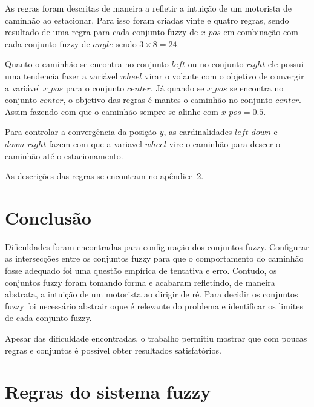 \documentclass[12pt, a4paper]{article}
\begin{document}
As regras foram descritas de maneira a refletir a intuição de um motorista de caminhão ao estacionar.
Para isso foram criadas vinte e quatro regras, sendo resultado de uma regra para cada conjunto fuzzy de $x\_pos$ em combinação com cada conjunto fuzzy de $angle$ sendo $3 \times 8 = 24$.

Quanto o caminhão se encontra no conjunto $left$ ou no conjunto $right$ ele possui uma tendencia fazer a variável $wheel$ virar o volante com o objetivo de convergir a variável $x\_pos$ para o conjunto $center$.
Já quando se $x\_pos$ se encontra no conjunto $center$, o objetivo das regras é mantes o caminhão no conjunto $center$.
Assim fazendo com que o caminhão sempre se alinhe com $x\_pos = 0.5$.

Para controlar a convergência da posição $y$, as cardinalidades $left\_down$ e $down\_right$ fazem com que a variavel $wheel$ vire o caminhão para descer o caminhão até o estacionamento.

As descrições das regras se encontram no apêndice~\ref{sec:apendice}.

\section{Conclusão}

Dificuldades foram encontradas para configuração dos conjuntos fuzzy.
Configurar as intersecções entre os conjuntos fuzzy para que o comportamento do caminhão fosse adequado foi uma questão empírica de tentativa e erro.
Contudo, os conjuntos fuzzy foram tomando forma e acabaram refletindo, de maneira abstrata, a intuição de um motorista ao dirigir de ré.
Para decidir os conjuntos fuzzy foi necessário abstrair oque é relevante do problema e identificar os limites de cada conjunto fuzzy.

Apesar das dificuldade encontradas, o trabalho permitiu mostrar que com poucas regras e conjuntos é possível obter resultados satisfatórios.



\appendix
\section{Regras do sistema fuzzy}\label{sec:apendice}
\end{document}
